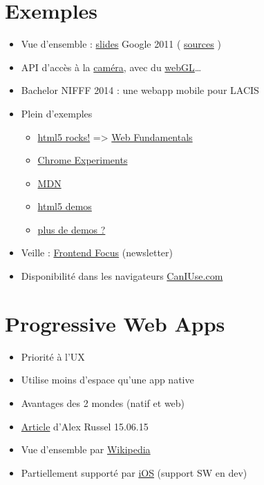 \hypertarget{exemples}{%
\section{Exemples}\label{exemples}}

\begin{itemize}
\tightlist
\item
  Vue d'ensemble :
  \href{http://web.archive.org/web/20150525080904/http://slides.html5rocks.com/\#landing-slide}{slides}
  Google 2011 (
  \href{https://github.com/html5rocks/slides.html5rocks.com}{sources} )
\item
  API d'accès à la
  \href{http://www.soundstep.com/blog/experiments/jsdetection/}{caméra},
  avec du
  \href{http://auduno.github.io/clmtrackr/examples/facesubstitution.html}{webGL}\ldots{}
\item
  Bachelor NIFFF 2014 : une webapp mobile pour LACIS
\item
  Plein d'exemples

  \begin{itemize}
  \tightlist
  \item
    \href{http://www.html5rocks.com/}{html5 rocks!} =\textgreater{}
    \href{https://developers.google.com/web/}{Web Fundamentals}
  \item
    \href{http://www.chromeexperiments.com/}{Chrome Experiments}
  \item
    \href{https://developer.mozilla.org/en-US/demos/tag/tech:html5}{MDN}
  \item
    \href{http://html5demos.com/}{html5 demos}
  \item
    \href{http://bit.ly/VJaqjb}{plus de demos ?}
  \end{itemize}
\item
  Veille : \href{http://html5weekly.com/}{Frontend Focus} (newsletter)
\item
  Disponibilité dans les navigateurs
  \href{https://caniuse.com/}{CanIUse.com}
\end{itemize}

\hypertarget{progressive-web-apps}{%
\section{Progressive Web Apps}\label{progressive-web-apps}}

\begin{itemize}
\tightlist
\item
  Priorité à l'UX
\item
  Utilise moins d'espace qu'une app native
\item
  Avantages des 2 mondes (natif et web)
\item
  \href{https://infrequently.org/2015/06/progressive-apps-escaping-tabs-without-losing-our-soul/}{Article}
  d'Alex Russel 15.06.15
\item
  Vue d'ensemble par
  \href{https://en.wikipedia.org/wiki/Progressive_web_app}{Wikipedia}
\item
  Partiellement supporté par
  \href{https://stackoverflow.com/questions/41185471/what-is-progressive-web-app-solution-for-ios}{iOS}
  (support SW en dev)
\end{itemize}

